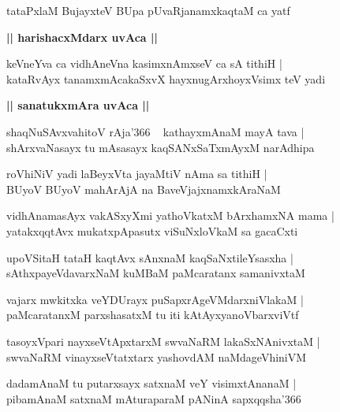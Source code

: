 \documentclass[twoside,12pt,openright]{book}
\newcounter{shloka}[chapter]
\def\uvaca#1{\centerline{{\large\textbf{#1}}}}
\begin{document}
\begin{shloka}%
tataPxlaM BujayxteV BUpa pUvaRjanamxkaqtaM ca yatf
\end{shloka}

\uvaca{|| harishacxMdarx uvAca ||}

\begin{shloka}%
keVneYva ca vidhAneVna kasimxnAmxseV ca sA tithiH |\\
kataRvAyx tanamxmAcakaSxvX hayxnugArxhoyxVsimx teV yadi
\end{shloka}

\uvaca{|| sanatukxmAra uvAca ||}

\begin{shloka}%
shaqNuSAvxvahitoV rAja\char'366 ~ kathayxmAnaM mayA tava |\\
shArxvaNasayx tu mAsasayx kaqSANxSaTxmAyxM narAdhipa
\end{shloka}

\begin{shloka}%
roVhiNiV yadi laBeyxVta jayaMtiV nAma sa tithiH |\\
BUyoV BUyoV mahArAjA na BaveVjajxnamxkAraNaM 
\end{shloka}

\begin{shloka}%
vidhAnamasAyx vakASxyXmi yathoVkatxM bArxhamxNA mama |\\
yatakxqqtAvx mukatxpApasutx viSuNxloVkaM sa gacaCxti
\end{shloka}

\begin{shloka}%
upoVSitaH tataH kaqtAvx sAnxnaM kaqSaNxtileYsasxha |\\
sAthxpayeVdavarxNaM kuMBaM paMcaratanx samanivxtaM 
\end{shloka}

\begin{shloka}%
vajarx mwkitxka veYDUrayx puSapxrAgeVMdarxniVlakaM |\\
paMcaratanxM parxshasatxM tu iti kAtAyxyanoVbarxviVtf
\end{shloka}

\begin{shloka}%
tasoyxVpari nayxseVtApxtarxM swvaNaRM lakaSxNAnivxtaM |\\
swvaNaRM vinayxseVtatxtarx yashovdAM naMdageVhiniVM
\end{shloka}

\begin{shloka}%
dadamAnaM tu putarxsayx satxnaM veY visimxtAnanaM |\\
pibamAnaM satxnaM mAturaparaM pANinA sapxqqsha\char'366
\end{shloka}
\end{document}

